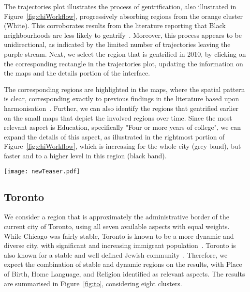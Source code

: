 The trajectories plot illustrates the process of gentrification, also
illustrated in Figure~\ref{fig:chiWorkflow}, progressively absorbing regions
from the orange cluster (White). This corroborates results from the literature
reporting that Black neighbourhoods are less likely to
gentrify~\citep{Hwang2014}. Moreover, this process appears to be unidirectional,
as indicated by the limited number of trajectories leaving the purple stream.
Next, we select the region that is gentrified in 2010, by clicking on the
corresponding rectangle in the trajectories plot, updating the information on
the maps and the details portion of the interface.

The corresponding regions are highlighted in the maps, where the spatial pattern
is clear, corresponding exactly to previous findings in the literature based
upon harmonisation~\citep{Hwang2014}. Further, we can also identify the regions
that gentrified earlier on the small maps that depict the involved regions over
time. Since the most relevant aspect is Education, specifically "Four or more
years of college", we can expand the details of this aspect, as illustrated in
the rightmost portion of Figure~\ref{fig:chiWorkflow}, which is increasing for
the whole city (grey band), but faster and to a higher level in this region
(black band).



\begin{figure*}
    \centering
 \texttt{[image: newTeaser.pdf]}
 \caption{Workflow to discover gentrification in Chicago: the purple cluster
 corresponds to high education / income. Its population is increasing over time,
 absorbing from the majority White cluster (orange). By selecting the purple
 cluster in 2010, the region is highlighted in the maps. The proportion of
 people with 4+ years of college is increasing in the whole city (grey IQRs),
 but significantly more in this region (black).\label{fig:chiWorkflow}}
\end{figure*}



\subsection{Toronto}

We consider a region that is approximately the administrative border of the
current city of Toronto, using all seven available aspects with equal weights.
While Chicago was fairly stable, Toronto is known to be a more dynamic and
diverse city, with significant and increasing immigrant
population~\citep{hulchanski2007three}. Toronto is also known for a stable and
well defined Jewish community~\citep{Shahar2016}. Therefore, we expect the
combination of stable and dynamic regions on the results, with Place of Birth,
Home Language, and Religion identified as relevant aspects. The results are
summarised in Figure~\ref{fig:to}, considering eight clusters.

